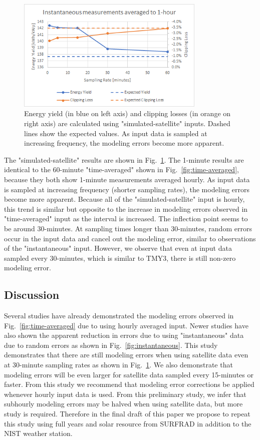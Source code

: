 \documentclass[conference]{IEEEtran}
\begin{document}
\begin{figure}[htbp]
\centerline{\includegraphics[width=9cm]{satellite-simulated.png}}
\caption{Energy yield (in blue on left axis) and clipping losses (in orange on right axis) are calculated using "simulated-satellite" inputs. Dashed lines show the expected values. As input data is sampled at increasing frequency, the modeling errors become more apparent.}
\label{fig:satellite-simulated}
\end{figure}

The "simulated-satellite" results are shown in Fig.~\ref{fig:satellite-simulated}. The 1-minute results are identical to the 60-minute "time-averaged" shown in Fig.~\ref{fig:time-averaged}, because they both show 1-minute measurements averaged hourly. As input data is sampled at increasing frequency (shorter sampling rates), the modeling errors become more apparent. Because all of the "simulated-satellite" input is hourly, this trend is similar but opposite to the increase in modeling errors observed in "time-averaged" input as the interval is increased. The inflection point seems to be around 30-minutes. At sampling times longer than 30-minutes, random errors occur in the input data and cancel out the modeling error, similar to observations of the "instantaneous" input. However, we observe that even at input data sampled every 30-minutes, which is similar to TMY3, there is still non-zero modeling error.

\subsection{Discussion}
Several studies have already demonstrated the modeling errors observed in Fig.~\ref{fig:time-averaged} due to using hourly averaged input. Newer studies have also shown the apparent reduction in errors due to using "instantaneous" data due to random errors as shown in Fig.~\ref{fig:instantaneous}. This study demonstrates that there are still modeling errors when using satellite data even at 30-minute sampling rates as shown in Fig.~\ref{fig:satellite-simulated}. We also demonstrate that modeling errors will be even larger for satellite data sampled every 15-minutes or faster. From this study we recommend that modeling error corrections be applied whenever hourly input data is used. From this preliminary study, we infer that subhourly modeling errors may be halved when using satellite data, but more study is required. Therefore in the final draft of this paper we propose to repeat this study using full years and solar resource from SURFRAD in addition to the NIST weather station.
\end{document}
